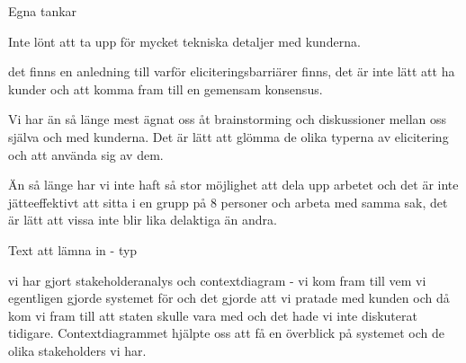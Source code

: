 \documentclass[a4paper]{article}
\begin{document}
Egna tankar

Inte lönt att ta upp för mycket tekniska detaljer med kunderna.

det finns en anledning till varför eliciteringsbarriärer finns, det är inte lätt att ha kunder och att komma fram till en gemensam konsensus.

Vi har än så länge mest ägnat oss åt brainstorming och diskussioner mellan oss själva och med kunderna. Det är lätt att glömma de olika typerna av elicitering och att använda sig av dem. 

Än så länge har vi inte haft så stor möjlighet att dela upp arbetet och det är inte jätteeffektivt att sitta i en grupp på 8 personer och arbeta med samma sak, det är lätt att vissa inte blir lika delaktiga än andra. 

Text att lämna in - typ

vi har gjort stakeholderanalys och contextdiagram - vi kom fram till vem vi egentligen gjorde systemet för och det gjorde att vi pratade med kunden och då kom vi fram till att staten skulle vara med och det hade vi inte diskuterat tidigare. Contextdiagrammet hjälpte oss att få en överblick på systemet och de olika stakeholders vi har. 

	
\end{document}

